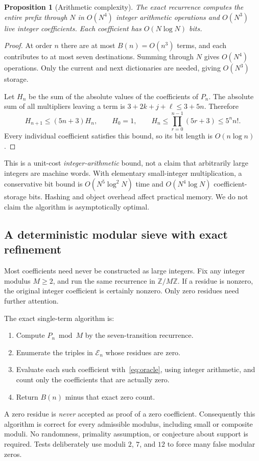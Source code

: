 \documentclass[11pt]{article}
\numberwithin{equation}{section}
\newtheorem{proposition}[theorem]{Proposition}
\theoremstyle{definition}
\theoremstyle{remark}
\newcommand{\Z}{\mathbb Z}
\begin{document}
\begin{proposition}[Arithmetic complexity]\label{prop:complexity}
The exact recurrence computes the entire prefix through $N$ in $O(N^4)$
integer arithmetic operations and $O(N^3)$ live integer coefficients.
Each coefficient has $O(N\log N)$ bits.
\end{proposition}
\begin{proof}
At order $n$ there are at most $B(n)=O(n^3)$ terms, and each contributes to
at most seven destinations. Summing through $N$ gives $O(N^4)$ operations.
Only the current and next dictionaries are needed, giving $O(N^3)$ storage.

Let $H_n$ be the sum of the absolute values of the coefficients of $P_n$.
The absolute sum of all multipliers leaving a term is
$3+2k+j+\ell\le3+5n$. Therefore
\[
 H_{n+1}\le(5n+3)H_n,\qquad H_0=1,
 \qquad H_n\le\prod_{r=0}^{n-1}(5r+3)\le5^n n!.
\]
Every individual coefficient satisfies this bound, so its bit length is
$O(n\log n)$.
\end{proof}

This is a unit-cost \emph{integer-arithmetic} bound, not a claim that
arbitrarily large integers are machine words. With elementary small-integer
multiplication, a conservative bit bound is $O(N^5\log^2N)$ time and
$O(N^4\log N)$ coefficient-storage bits. Hashing and object overhead affect
practical memory. We do not claim the algorithm is asymptotically optimal.

\subsection{A deterministic modular sieve with exact refinement}

Most coefficients need never be constructed as large integers. Fix any
integer modulus $M\ge2$, and run the same recurrence in $\Z/M\Z$.
If a residue is nonzero, the original integer coefficient is certainly
nonzero. Only zero residues need further attention.

The exact single-term algorithm is:
\begin{enumerate}
\item Compute $P_n\bmod M$ by the seven-transition recurrence.
\item Enumerate the triples in $\mathcal E_n$ whose residues are zero.
\item Evaluate each such coefficient with~\eqref{eq:oracle}, using integer
      arithmetic, and count only the coefficients that are actually zero.
\item Return $B(n)$ minus that exact zero count.
\end{enumerate}
A zero residue is \emph{never} accepted as proof of a zero coefficient.
Consequently this algorithm is correct for every admissible modulus,
including small or composite moduli. No randomness, primality assumption,
or conjecture about support is required. Tests deliberately use moduli
$2$, $7$, and $12$ to force many false modular zeros.
\end{document}
